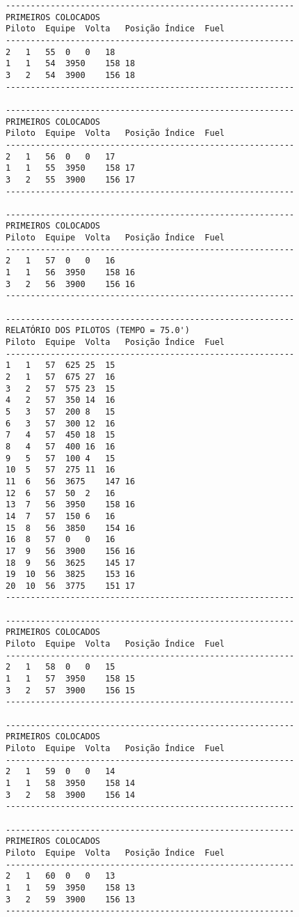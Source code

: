 \documentclass[12pt]{article}
\begin{document}
\begin{verbatim}
----------------------------------------------------------
PRIMEIROS COLOCADOS
Piloto	Equipe	Volta	Posição	Índice	Fuel
----------------------------------------------------------
2	1	55	0	0	18
1	1	54	3950	158	18
3	2	54	3900	156	18
----------------------------------------------------------

----------------------------------------------------------
PRIMEIROS COLOCADOS
Piloto	Equipe	Volta	Posição	Índice	Fuel
----------------------------------------------------------
2	1	56	0	0	17
1	1	55	3950	158	17
3	2	55	3900	156	17
----------------------------------------------------------

----------------------------------------------------------
PRIMEIROS COLOCADOS
Piloto	Equipe	Volta	Posição	Índice	Fuel
----------------------------------------------------------
2	1	57	0	0	16
1	1	56	3950	158	16
3	2	56	3900	156	16
----------------------------------------------------------

----------------------------------------------------------
RELATÓRIO DOS PILOTOS (TEMPO = 75.0')
Piloto	Equipe	Volta	Posição	Índice	Fuel
----------------------------------------------------------
1	1	57	625	25	15
2	1	57	675	27	16
3	2	57	575	23	15
4	2	57	350	14	16
5	3	57	200	8	15
6	3	57	300	12	16
7	4	57	450	18	15
8	4	57	400	16	16
9	5	57	100	4	15
10	5	57	275	11	16
11	6	56	3675	147	16
12	6	57	50	2	16
13	7	56	3950	158	16
14	7	57	150	6	16
15	8	56	3850	154	16
16	8	57	0	0	16
17	9	56	3900	156	16
18	9	56	3625	145	17
19	10	56	3825	153	16
20	10	56	3775	151	17
----------------------------------------------------------

----------------------------------------------------------
PRIMEIROS COLOCADOS
Piloto	Equipe	Volta	Posição	Índice	Fuel
----------------------------------------------------------
2	1	58	0	0	15
1	1	57	3950	158	15
3	2	57	3900	156	15
----------------------------------------------------------

----------------------------------------------------------
PRIMEIROS COLOCADOS
Piloto	Equipe	Volta	Posição	Índice	Fuel
----------------------------------------------------------
2	1	59	0	0	14
1	1	58	3950	158	14
3	2	58	3900	156	14
----------------------------------------------------------

----------------------------------------------------------
PRIMEIROS COLOCADOS
Piloto	Equipe	Volta	Posição	Índice	Fuel
----------------------------------------------------------
2	1	60	0	0	13
1	1	59	3950	158	13
3	2	59	3900	156	13
----------------------------------------------------------


\end{verbatim}
\end{document}
